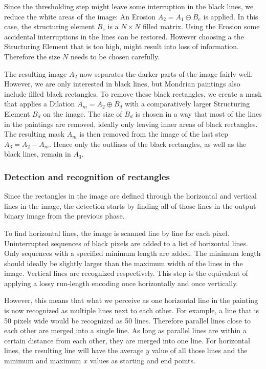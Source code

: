Since the thresholding step might leave some interruption in the black lines, we
reduce the white areas of the image: An Erosion $A_2 = A_1 \ominus B_e$ is
applied. In this case, the structuring element $B_e$ is a $N\times N$ filled
matrix. Using the Erosion some accidental interruptions in the lines can be
restored. However choosing a the Structuring Element that is too high, might
result into loss of information. Therefore the size $N$ needs to be chosen
carefully.

The resulting image $A_2$ now separates the darker parts of the image fairly
well. However, we are only interested in black lines, but Mondrian paintings
also include filled black rectangles. To remove these black rectangles, we
create a mask that applies a Dilation $A_m = A_2 \oplus B_d$ with a
comparatively larger Structuring Element $B_d$ on the image. The size of $B_d$
is chosen in a way that most of the lines in the paintings are removed, ideally
only leaving inner areas of black rectangles. The resulting mask $A_m$ is then
removed from the image of the last step $A_3 = A_2 - A_m$. Hence only the
outlines of the black rectangles, as well as the black lines, remain in $A_3$.

\subsubsection{Detection and recognition of rectangles}

Since the rectangles in the image are defined through the horizontal and
vertical lines in the image, the detection starts by finding all of those lines
in the output binary image from the previous phase.

To find horizontal lines, the image is scanned line by line for each pixel.
Uninterrupted sequences of black pixels are added to a list of horizontal lines.
Only sequences with a specified minimum length are added. The minimum length
should ideally be slightly larger than the maximum width of the lines in the
image. Vertical lines are recognized respectively. This step is the equivalent of
applying a lossy run-length encoding once horizontally and once vertically.

However, this means that what we perceive as one horizontal line in the painting
is now recognized as multiple lines next to each other. For example, a line that
is 50 pixels wide would be recognized as 50 lines. Therefore parallel lines
close to each other are merged into a single line. As long as parallel lines are
within a certain distance from each other, they are merged into one line. For
horizontal lines, the resulting line will have the average $y$ value of all
those lines and the minimum and maximum $x$ values as starting and end points.

